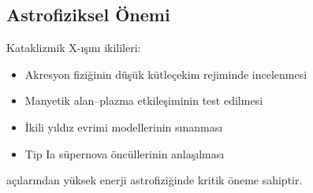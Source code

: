\subsection{Astrofiziksel Önemi}

Kataklizmik X-ışını ikilileri:
\begin{itemize}
    \item Akresyon fiziğinin düşük kütleçekim rejiminde incelenmesi
    \item Manyetik alan–plazma etkileşiminin test edilmesi
    \item İkili yıldız evrimi modellerinin sınanması
    \item Tip Ia süpernova öncüllerinin anlaşılması
\end{itemize}
açılarından yüksek enerji astrofiziğinde kritik öneme sahiptir.

